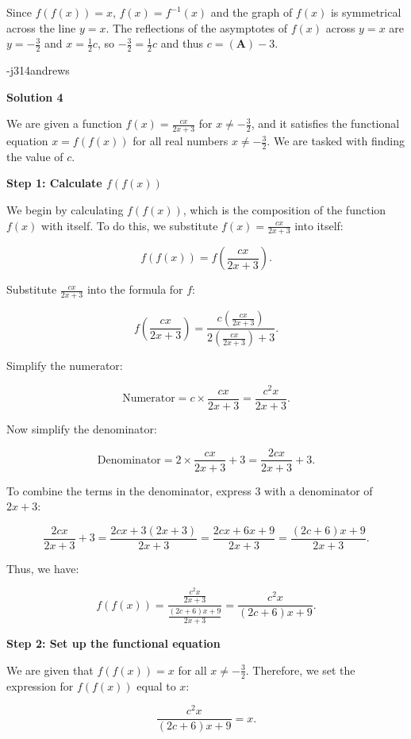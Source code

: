 \begin{enumerate}
 Since $f(f(x)) = x$, $f(x) = f^{-1}(x)$ and the graph of $f(x)$ is symmetrical across the line $y=x$.  The reflections of the asymptotes of $f(x)$ across $y=x$ are $y = -\frac{3}{2}$ and $x=\frac{1}{2}c$, so $-\frac{3}{2} = \frac{1}{2}c$ and thus $c= \boxed{(\textbf{A}) -3}$.

 -j314andrews

 



\textbf{Solution 4}

We are given a function $f(x) = \frac{cx}{2x + 3}$ for $x \neq -\frac{3}{2}$, and it satisfies the functional equation $x = f(f(x))$ for all real numbers $x \neq -\frac{3}{2}$. We are tasked with finding the value of $c$.

 \textbf{Step 1: Calculate $f(f(x))$}

 We begin by calculating $f(f(x))$, which is the composition of the function $f(x)$ with itself. To do this, we substitute $f(x) = \frac{cx}{2x + 3}$ into itself:

 
 \[f(f(x)) = f\left( \frac{cx}{2x + 3} \right).\]

 Substitute $\frac{cx}{2x + 3}$ into the formula for $f$:

 
 \[f\left( \frac{cx}{2x + 3} \right) = \frac{c \left( \frac{cx}{2x + 3} \right)}{2 \left( \frac{cx}{2x + 3} \right) + 3}.\]

 Simplify the numerator:

 
 \[\text{Numerator} = c \times \frac{cx}{2x + 3} = \frac{c^2 x}{2x + 3}.\]

 Now simplify the denominator:

 
 \[\text{Denominator} = 2 \times \frac{cx}{2x + 3} + 3 = \frac{2cx}{2x + 3} + 3.\]

 To combine the terms in the denominator, express $3$ with a denominator of $2x + 3$:

 
 \[\frac{2cx}{2x + 3} + 3 = \frac{2cx + 3(2x + 3)}{2x + 3} = \frac{2cx + 6x + 9}{2x + 3} = \frac{(2c + 6)x + 9}{2x + 3}.\]

 Thus, we have:

 
 \[f(f(x)) = \frac{\frac{c^2 x}{2x + 3}}{\frac{(2c + 6)x + 9}{2x + 3}} = \frac{c^2 x}{(2c + 6)x + 9}.\]

 \textbf{Step 2: Set up the functional equation}

 We are given that $f(f(x)) = x$ for all $x \neq -\frac{3}{2}$. Therefore, we set the expression for $f(f(x))$ equal to $x$:

 
 \[\frac{c^2 x}{(2c + 6)x + 9} = x.\]


\end{enumerate}
